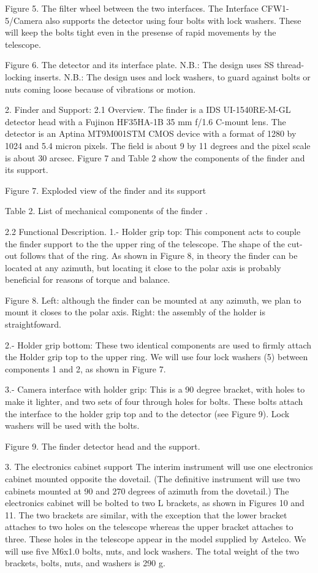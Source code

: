 Figure 5. The filter wheel between the two interfaces.
The Interface CFW1-5/Camera also supports the detector using four bolts with lock washers. These will keep the bolts tight even in the presense of rapid movements by the telescope.

Figure 6. The detector and its interface plate.  
N.B.: The design uses SS thread-locking inserts. 
N.B.: The design uses and lock washers, to guard against bolts or nuts coming loose because of vibrations or motion.

2.	Finder and Support:
2.1 Overview.
The finder is a IDS UI-1540RE-M-GL detector head with a Fujinon HF35HA-1B 35 mm f/1.6 C-mount lens. The detector is an Aptina MT9M001STM CMOS device with a format of 1280 by 1024 and 5.4 micron pixels. The field is about 9 by 11 degrees and the pixel scale is about 30 arcsec. 
Figure 7 and Table 2 show the components of the finder and its support.

Figure 7. Exploded view of the finder and its support


Table 2. List of mechanical components of the finder 
.

2.2 Functional Description.
1.- Holder grip top: This component acts to couple the finder support to the the upper ring of the telescope. The shape of the cut-out follows that of the ring. As shown in Figure 8, in theory the finder can be located at any azimuth, but locating it close to the polar axis is probably beneficial for reasons of torque and balance.
 
Figure 8. Left: although the finder can be mounted at any azimuth, we plan to mount it closes to the polar axis. Right: the assembly of the holder is straightfoward. 

2.- Holder grip bottom: These two identical components are used to firmly attach the Holder grip top to the upper ring. We will use four lock washers (5) between components 1 and 2, as shown in Figure 7.

3.- Camera interface with holder grip: This is a 90 degree bracket, with holes to make it lighter, and two sets of four through holes for bolts. These bolts attach the interface to the holder grip top and to the detector (see Figure 9). Lock washers will be used with the bolts.

Figure 9. The finder detector head and the support.

3.	The electronics cabinet support
The interim instrument will use one electronics cabinet mounted opposite the dovetail. (The definitive instrument will use two cabinets mounted at 90 and 270 degrees of azimuth from the dovetail.)
The electronics cabinet will be bolted to two L brackets, as shown in Figures 10 and 11. The two brackets are similar, with the exception that the lower bracket attaches to two holes on the telescope whereas the upper bracket attaches to three. These holes in the telescope appear in the model supplied by Astelco. We will use five M6x1.0 bolts, nuts, and lock washers.
The total weight of the two brackets, bolts, nuts, and washers is 290 g.



